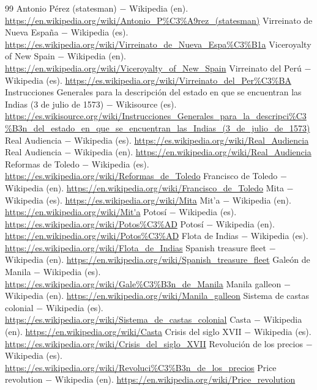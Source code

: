 \documentclass{book}
\begin{document}
\begin{thebibliography}{99}
 Antonio Pérez (statesman) \(-\) Wikipedia (en). \url{https://en.wikipedia.org/wiki/Antonio_P%C3%A9rez_(statesman)}
 Virreinato de Nueva España \(-\) Wikipedia (es). \url{https://es.wikipedia.org/wiki/Virreinato_de_Nueva_Espa%C3%B1a}
 Viceroyalty of New Spain \(-\) Wikipedia (en). \url{https://en.wikipedia.org/wiki/Viceroyalty_of_New_Spain}
 Virreinato del Perú \(-\) Wikipedia (es). \url{https://es.wikipedia.org/wiki/Virreinato_del_Per%C3%BA}
 Instrucciones Generales para la descripción del estado en que se encuentran las Indias (3 de julio de 1573) \(-\) Wikisource (es). \url{https://es.wikisource.org/wiki/Instrucciones_Generales_para_la_descripci%C3%B3n_del_estado_en_que_se_encuentran_las_Indias_(3_de_julio_de_1573)}
 Real Audiencia \(-\) Wikipedia (es). \url{https://es.wikipedia.org/wiki/Real_Audiencia}
 Real Audiencia \(-\) Wikipedia (en). \url{https://en.wikipedia.org/wiki/Real_Audiencia}
 Reformas de Toledo \(-\) Wikipedia (es). \url{https://es.wikipedia.org/wiki/Reformas_de_Toledo}
 Francisco de Toledo \(-\) Wikipedia (en). \url{https://en.wikipedia.org/wiki/Francisco_de_Toledo}
 Mita \(-\) Wikipedia (es). \url{https://es.wikipedia.org/wiki/Mita}
 Mit'a \(-\) Wikipedia (en). \url{https://en.wikipedia.org/wiki/Mit'a}
 Potosí \(-\) Wikipedia (es). \url{https://es.wikipedia.org/wiki/Potos%C3%AD}
 Potosí \(-\) Wikipedia (en). \url{https://en.wikipedia.org/wiki/Potos%C3%AD}
 Flota de Indias \(-\) Wikipedia (es). \url{https://es.wikipedia.org/wiki/Flota_de_Indias}
 Spanish treasure fleet \(-\) Wikipedia (en). \url{https://en.wikipedia.org/wiki/Spanish_treasure_fleet}
 Galeón de Manila \(-\) Wikipedia (es). \url{https://es.wikipedia.org/wiki/Gale%C3%B3n_de_Manila}
 Manila galleon \(-\) Wikipedia (en). \url{https://en.wikipedia.org/wiki/Manila_galleon}
 Sistema de castas colonial \(-\) Wikipedia (es). \url{https://es.wikipedia.org/wiki/Sistema_de_castas_colonial}
 Casta \(-\) Wikipedia (en). \url{https://en.wikipedia.org/wiki/Casta}
 Crisis del siglo XVII \(-\) Wikipedia (es). \url{https://es.wikipedia.org/wiki/Crisis_del_siglo_XVII}
 Revolución de los precios \(-\) Wikipedia (es). \url{https://es.wikipedia.org/wiki/Revoluci%C3%B3n_de_los_precios}
 Price revolution \(-\) Wikipedia (en). \url{https://en.wikipedia.org/wiki/Price_revolution}

\end{thebibliography}
\end{document}
